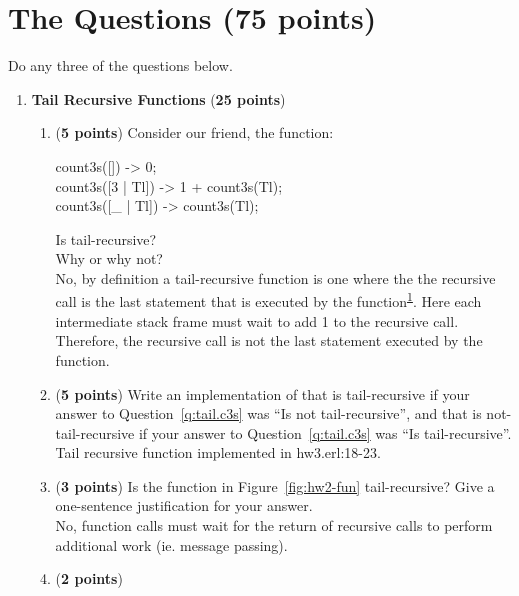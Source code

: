\documentclass{article}
\newenvironment{answer}
{\color{blue}}
{\normalfont}
\begin{document}
\section{The Questions (75 points)}
Do any three of the questions below.
\begin{enumerate}
  \item \textbf{Tail Recursive Functions} (\textbf{25 points})\\
    \begin{enumerate}
      \item (\textbf{5 points})\label{q:tail.c3s}
	Consider our friend, the  function:
	\begin{xcode}
	  count3s([]) -> 0;\\
	  count3s([3 | Tl]) -> 1 + count3s(Tl);\\
	  count3s([\_ | Tl]) -> count3s(Tl);
	\end{xcode}
	Is  tail-recursive?\\
	Why or why not? \\
    \begin{answer}
      No, by definition a tail-recursive function is one where the the recursive call 
      is the last statement that is executed by the function\textsuperscript{{\hyperlink{ref1}{1}}}.
      Here each intermediate stack frame must wait to add 1 to the recursive call. Therefore, the recursive 
      call is not the last statement executed by the function.
    \end{answer}
      \item (\textbf{5 points}) Write an implementation of  that is tail-recursive
	if your answer to Question~\ref{q:tail.c3s} was ``Is not tail-recursive'', and that is
	not-tail-recursive if your answer to Question~\ref{q:tail.c3s} was ``Is tail-recursive''. \\
    \begin{answer}
      Tail recursive function implemented in hw3.erl:18-23.
    \end{answer}
      \item (\textbf{3 points})
	Is the function  in Figure~\ref{fig:hw2-fun} tail-recursive?
	Give a one-sentence justification for your answer. \\
    \begin{answer}
      No, function calls must wait for the return of recursive calls to perform additional work (ie. message passing).
    \end{answer}
      \item (\textbf{2 points})

\end{enumerate}
\end{enumerate}
\end{document}
